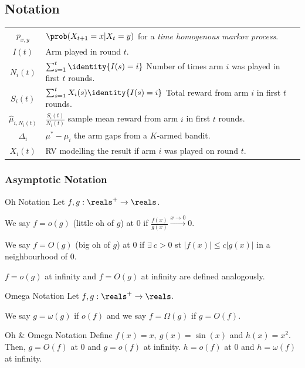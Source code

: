 \documentclass[11pt,a4paper]{article}
\begin{document}
\subsection{Notation}
\begin{tabular}{|c|l|}
  \hline
  $p_{x,y}$&$\prob(X_{t+1}=x|X_{t}=y)$ for a \textit{time homogenous markov process}.\\
  $I(t)$&Arm played in round $t$.\\
  $N_i(t)$&$\sum_{s=1}^t\identity\{I(s)=i\}$ Number of times arm $i$ was played in first $t$ rounds.\\
  $S_i(t)$&$\sum_{s=1}^tX_i(s)\identity\{I(s)=i\}$ Total reward from arm $i$ in first $t$ rounds.\\
  $\hat\mu_{i,N_i(t)}$&$\frac{S_i(t)}{N_i(t)}$ sample mean reward from arm $i$ in first $t$ rounds.\\
  $\Delta_i$&$\mu^*-\mu_i$ the arm gaps from a $K$-armed bandit.\\
  $X_i(t)$&RV modelling the result if arm $i$ was played on round $t$.\\
  \hline
\end{tabular}

\subsubsection{Asymptotic Notation}

\begin{definition}{Oh Notation}
  Let $f,g:\reals^+\to\reals$.
  \par We say $f=o(g)$ (little oh of $g$) at 0 if $\frac{f(x)}{g(x)}\overset{x\to0}\longrightarrow0$.
  \par We say $f=O(g)$ (big oh of $g$) at 0 if $\exists\ c>0$ st $|f(x)|\leq c|g(x)|$ in a neighbourhood of 0.
  \par $f=o(g)$ at infinity and $f=O(g)$ at infinity are defined analogously.
\end{definition}

\begin{definition}{Omega Notation}
  Let $f,g:\reals^+\to\reals$.
  \par We say $g=\omega(g)$ if $o(f)$ and we say $f=\Omega(g)$ if $g=O(f)$.
\end{definition}

\begin{example}{Oh \& Omega Notation}
  Define $f(x)=x,\ g(x)=\sin(x)$ and $h(x)=x^2$.\\
  Then, $g=O(f)$ at 0 and $g=o(f)$ at infinity. $h=o(f)$ at 0 and $h=\omega(f)$ at infinity.
\end{example}
\end{document}
